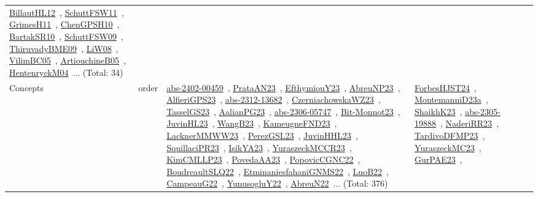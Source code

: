 {\begin{longtable}{lp{3cm}>{\raggedright\arraybackslash}p{6cm}>{\raggedright\arraybackslash}p{6cm}>{\raggedright\arraybackslash}p{8cm}}
\href{works/BillautHL12.pdf}{BillautHL12}~\cite{BillautHL12}, \href{works/SchuttFSW11.pdf}{SchuttFSW11}~\cite{SchuttFSW11}, \href{works/GrimesH11.pdf}{GrimesH11}~\cite{GrimesH11}, \href{works/ChenGPSH10.pdf}{ChenGPSH10}~\cite{ChenGPSH10}, \href{works/BartakSR10.pdf}{BartakSR10}~\cite{BartakSR10}, \href{works/SchuttFSW09.pdf}{SchuttFSW09}~\cite{SchuttFSW09}, \href{works/ThiruvadyBME09.pdf}{ThiruvadyBME09}~\cite{ThiruvadyBME09}, \href{works/LiW08.pdf}{LiW08}~\cite{LiW08}, \href{works/VilimBC05.pdf}{VilimBC05}~\cite{VilimBC05}, \href{works/ArtiouchineB05.pdf}{ArtiouchineB05}~\cite{ArtiouchineB05}, \href{works/HentenryckM04.pdf}{HentenryckM04}~\cite{HentenryckM04}... (Total: 34)\\
Concepts & order & \href{works/abs-2402-00459.pdf}{abs-2402-00459}~\cite{abs-2402-00459}, \href{works/PrataAN23.pdf}{PrataAN23}~\cite{PrataAN23}, \href{works/EfthymiouY23.pdf}{EfthymiouY23}~\cite{EfthymiouY23}, \href{works/AbreuNP23.pdf}{AbreuNP23}~\cite{AbreuNP23}, \href{works/AlfieriGPS23.pdf}{AlfieriGPS23}~\cite{AlfieriGPS23}, \href{works/abs-2312-13682.pdf}{abs-2312-13682}~\cite{abs-2312-13682}, \href{works/CzerniachowskaWZ23.pdf}{CzerniachowskaWZ23}~\cite{CzerniachowskaWZ23}, \href{works/TasselGS23.pdf}{TasselGS23}~\cite{TasselGS23}, \href{works/AalianPG23.pdf}{AalianPG23}~\cite{AalianPG23}, \href{works/abs-2306-05747.pdf}{abs-2306-05747}~\cite{abs-2306-05747}, \href{works/Bit-Monnot23.pdf}{Bit-Monnot23}~\cite{Bit-Monnot23}, \href{works/JuvinHL23.pdf}{JuvinHL23}~\cite{JuvinHL23}, \href{works/WangB23.pdf}{WangB23}~\cite{WangB23}, \href{works/KameugneFND23.pdf}{KameugneFND23}~\cite{KameugneFND23}, \href{works/LacknerMMWW23.pdf}{LacknerMMWW23}~\cite{LacknerMMWW23}, \href{works/PerezGSL23.pdf}{PerezGSL23}~\cite{PerezGSL23}, \href{works/JuvinHHL23.pdf}{JuvinHHL23}~\cite{JuvinHHL23}, \href{works/SquillaciPR23.pdf}{SquillaciPR23}~\cite{SquillaciPR23}, \href{works/IsikYA23.pdf}{IsikYA23}~\cite{IsikYA23}, \href{works/YuraszeckMCCR23.pdf}{YuraszeckMCCR23}~\cite{YuraszeckMCCR23}, \href{works/KimCMLLP23.pdf}{KimCMLLP23}~\cite{KimCMLLP23}, \href{works/PovedaAA23.pdf}{PovedaAA23}~\cite{PovedaAA23}, \href{works/PopovicCGNC22.pdf}{PopovicCGNC22}~\cite{PopovicCGNC22}, \href{works/BoudreaultSLQ22.pdf}{BoudreaultSLQ22}~\cite{BoudreaultSLQ22}, \href{works/EtminaniesfahaniGNMS22.pdf}{EtminaniesfahaniGNMS22}~\cite{EtminaniesfahaniGNMS22}, \href{works/LuoB22.pdf}{LuoB22}~\cite{LuoB22}, \href{works/CampeauG22.pdf}{CampeauG22}~\cite{CampeauG22}, \href{works/YunusogluY22.pdf}{YunusogluY22}~\cite{YunusogluY22}, \href{works/AbreuN22.pdf}{AbreuN22}~\cite{AbreuN22}... (Total: 376) & \href{works/ForbesHJST24.pdf}{ForbesHJST24}~\cite{ForbesHJST24}, \href{works/MontemanniD23a.pdf}{MontemanniD23a}~\cite{MontemanniD23a}, \href{works/ShaikhK23.pdf}{ShaikhK23}~\cite{ShaikhK23}, \href{works/abs-2305-19888.pdf}{abs-2305-19888}~\cite{abs-2305-19888}, \href{works/NaderiRR23.pdf}{NaderiRR23}~\cite{NaderiRR23}, \href{works/TardivoDFMP23.pdf}{TardivoDFMP23}~\cite{TardivoDFMP23}, \href{works/YuraszeckMC23.pdf}{YuraszeckMC23}~\cite{YuraszeckMC23}, \href{works/GurPAE23.pdf}{GurPAE23}~\cite{GurPAE23}, 
\end{longtable}}
